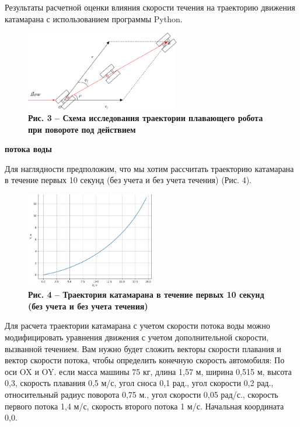 Результаты расчетной оценки влияния скорости течения на траекторию
движения катамарана с использованием программы Python.

\begin{figure}[H]
	\centering
	\includegraphics[width=0.6\textwidth]{assets/210}
	\caption*{\bfseries Рис. 3 -- Схема исследования траектории плавающего робота при повороте под действием}  
\end{figure}


{\bfseries потока воды}

Для наглядности предположим, что мы хотим рассчитать траекторию
катамарана в течение первых 10 секунд (без учета и без учета течения)
(Рис. 4).

\begin{figure}[H]
	\centering
	\includegraphics[width=0.5\textwidth]{assets/211}
	\caption*{\bfseries Рис. 4 -- Траектория катамарана в течение первых 10 секунд (без
  учета и без учета течения)}
\end{figure}



Для расчета траектории катамарана с учетом скорости потока воды можно
модифицировать уравнения движения с учетом дополнительной скорости,
вызванной течением. Вам нужно будет сложить векторы скорости плавания и
вектор скорости потока, чтобы определить конечную скорость автомобиля:
По оси OX и OY. если масса машины 75 кг, длина 1,57 м, ширина 0,515 м,
высота 0,3, скорость плавания 0,5 м/с, угол сноса 0,1 рад., угол
скорости 0,2 рад., относительный радиус поворота 0,75 м., угол скорости
0,05 рад/с., скорость первого потока 1,4 м/с, скорость второго потока 1
м/с. Начальная координата 0,0.

